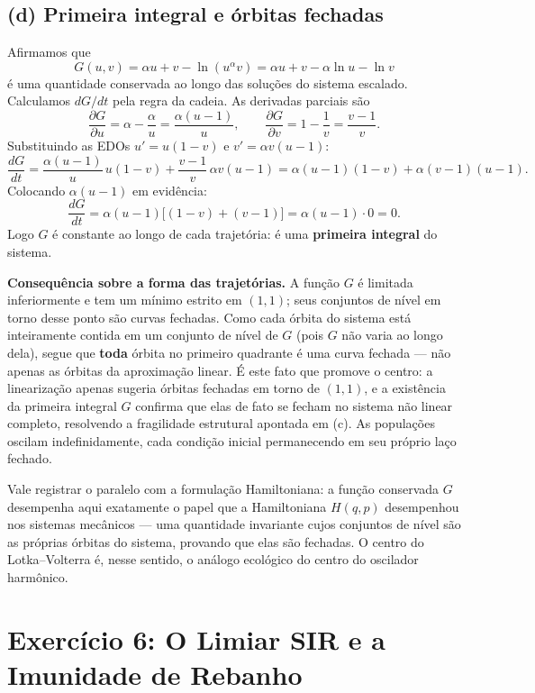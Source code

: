 \documentclass{article}
\begin{document}
\subsection*{(d) Primeira integral e órbitas fechadas}

Afirmamos que
\[
G(u,v) = \alpha u + v - \ln\!\left(u^{\alpha} v\right)
= \alpha u + v - \alpha\ln u - \ln v
\]
é uma quantidade conservada ao longo das soluções do sistema escalado.
Calculamos $dG/dt$ pela regra da cadeia. As derivadas parciais são
\[
\frac{\partial G}{\partial u} = \alpha - \frac{\alpha}{u} = \frac{\alpha(u - 1)}{u},
\qquad
\frac{\partial G}{\partial v} = 1 - \frac{1}{v} = \frac{v - 1}{v}.
\]
Substituindo as EDOs $u' = u(1 - v)$ e $v' = \alpha v(u - 1)$:
\[
\frac{dG}{dt}
= \frac{\alpha(u - 1)}{u}\,u(1 - v)
+ \frac{v - 1}{v}\,\alpha v(u - 1)
= \alpha(u - 1)(1 - v) + \alpha(v - 1)(u - 1).
\]
Colocando $\alpha(u - 1)$ em evidência:
\[
\frac{dG}{dt}
= \alpha(u - 1)\bigl[(1 - v) + (v - 1)\bigr]
= \alpha(u - 1)\cdot 0 = 0.
\]
Logo $G$ é constante ao longo de cada trajetória: é uma \textbf{primeira integral}
do sistema.

\textbf{Consequência sobre a forma das trajetórias.} A função $G$ é limitada
inferiormente e tem um mínimo estrito em $(1,1)$; seus conjuntos de nível em torno
desse ponto são curvas fechadas. Como cada órbita do sistema está inteiramente
contida em um conjunto de nível de $G$ (pois $G$ não varia ao longo dela), segue
que \textbf{toda} órbita no primeiro quadrante é uma curva fechada — não apenas as
órbitas da aproximação linear. É este fato que promove o centro: a linearização
apenas sugeria órbitas fechadas em torno de $(1,1)$, e a existência da primeira
integral $G$ confirma que elas de fato se fecham no sistema não linear completo,
resolvendo a fragilidade estrutural apontada em (c). As populações oscilam
indefinidamente, cada condição inicial permanecendo em seu próprio laço fechado.

Vale registrar o paralelo com a formulação Hamiltoniana: a função conservada $G$
desempenha aqui exatamente o papel que a Hamiltoniana $H(q,p)$ desempenhou nos
sistemas mecânicos — uma quantidade invariante cujos conjuntos de nível são as
próprias órbitas do sistema, provando que elas são fechadas. O centro do
Lotka--Volterra é, nesse sentido, o análogo ecológico do centro do oscilador
harmônico.

\section*{Exercício 6: O Limiar SIR e a Imunidade de Rebanho}
\end{document}
